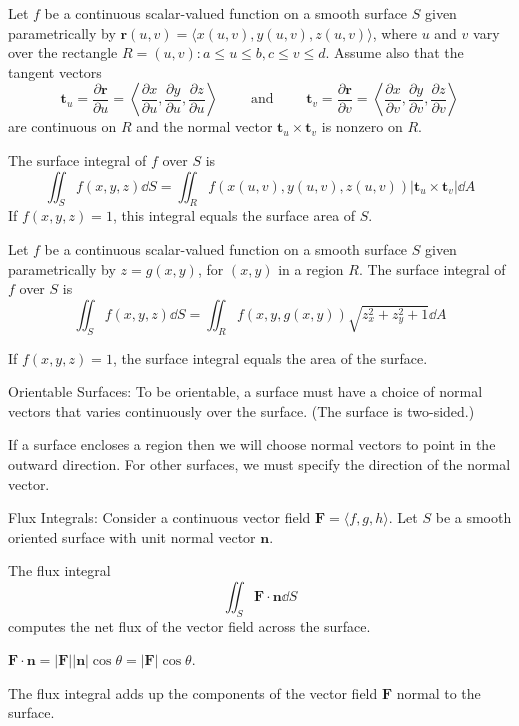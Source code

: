 \documentclass[../calc3.tex]{subfiles}
\begin{document}
\begin{definition}
    Let $f$ be a continuous scalar-valued function on a smooth surface $S$ given parametrically by 
    $\textbf{r}(u,v)=\langle x(u,v), y(u,v), z(u,v)\rangle$, where $u$ and $v$ vary over the rectangle 
    $R={(u,v):a\leq u\leq b, c\leq v\leq d}$. Assume also that the tangent vectors
    \[ \textbf{t}_u = \frac{\partial \textbf{r}}{\partial u} = \left\langle \frac{\partial x}{\partial u}, \frac{\partial y}{\partial u}, \frac{\partial z}{\partial u}\right\rangle \qquad \text{ and } \qquad \textbf{t}_v = \frac{\partial\textbf{r}}{\partial v}=\left\langle\frac{\partial x}{\partial v},\frac{\partial y}{\partial v},\frac{\partial z}{\partial v} \right\rangle\]
    are continuous on $R$ and the normal vector $\textbf{t}_u \times \textbf{t}_v$ is nonzero on $R$.

    The surface integral of $f$ over $S$ is 
    \[\iint_S f(x,y,z)\dd S = \iint_R f(x(u,v), y(u,v), z(u,v))|\textbf{t}_u\times \textbf{t}_v|\dd A\]
    If $f(x,y,z)=1$, this integral equals the surface area of $S$.
\end{definition}

\begin{theorem}
    Let $f$ be a continuous scalar-valued function on a smooth surface $S$ given parametrically by 
    $z=g(x,y)$, for $(x,y)$ in a region $R$. The surface integral of $f$ over $S$ is 
    \[\iint_S f(x,y,z)\dd S = \iint_R f(x,y,g(x,y))\sqrt{z_x^2 + z_y^2 + 1}\dd A\]
    
    If $f(x,y,z)=1$, the surface integral equals the area of the surface.
\end{theorem}

Orientable Surfaces: To be orientable, a surface must have a choice of normal vectors that varies continuously over the surface. (The surface is two-sided.)

If a surface encloses a region then we will choose normal vectors to point in the outward direction. For other surfaces, we must specify the direction of the normal vector.

\begin{definition}
    Flux Integrals: Consider a continuous vector field $\textbf{F}=\langle f,g,h\rangle$. Let $S$ be a smooth oriented surface with unit normal vector $\textbf{n}$.

    The flux integral 
    \[ \iint_S \textbf{F}\cdot \textbf{n}\dd S\]
    computes the net flux of the vector field across the surface.

    $\textbf{F}\cdot\textbf{n}=|\textbf{F}||\textbf{n}|\cos\theta = |\textbf{F}|\cos\theta$.

    The flux integral adds up the components of the vector field $\textbf{F}$ normal to the surface.
\end{definition}
\end{document}
